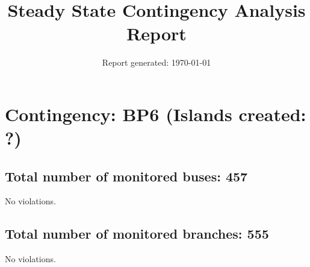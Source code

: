 \documentclass{article}%
\title{Steady State Contingency Analysis Report\vspace{-3ex}}%
\date{Report generated: \today\vspace{-2ex}}%
\begin{document}
%
\normalsize%
\maketitle%
\section*{Contingency: BP6 (Islands created: ?)}%
\label{sec:ContingencyBP6(Islandscreated?)}%
\subsection*{Total number of monitored buses: 457}%
\label{subsec:Totalnumberofmonitoredbuses457}%
No violations.

%
\subsection*{Total number of monitored branches: 555}%
\label{subsec:Totalnumberofmonitoredbranches555}%
No violations.

%
\end{document}
